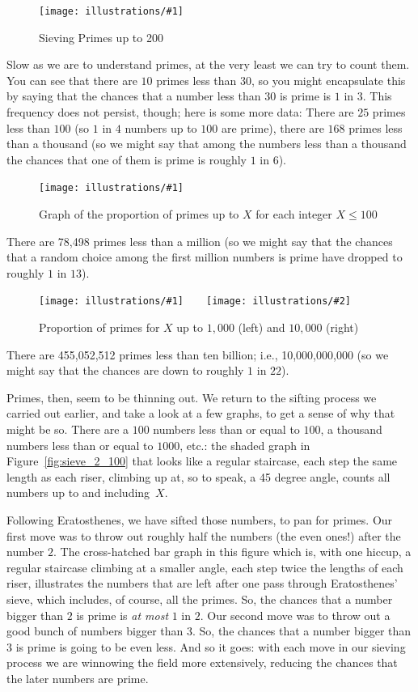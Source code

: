 \documentclass[openany]{book}
\newcommand{\ill}[3]{%
   \begin{figure}[H]%
   \vspace{-2ex}
   \centering%
   \texttt{[image: illustrations/\#1]}%
   \caption{#3}%
   \vspace{-2ex}
    \end{figure}}
\newcommand{\illtwo}[4]{%
   \begin{figure}[H]\centering%
   \texttt{[image: illustrations/\#1]}$\qquad$\texttt{[image: illustrations/\#2]}%
   \caption{#4}%
    \end{figure}}
\theoremstyle{plain}
\theoremstyle{definition}
\begin{document}
\ill{sieve200}{.8}{Sieving Primes up to 200}

Slow as we are to understand primes, at the very least we can try to
count them. You can see that there are $10$ primes less than $30$, so
you might encapsulate this by saying that the chances that a number
less than $30$ is prime is $1$ in $3$.  This frequency does not
persist, though; here is some more data: There are $25$ primes less
than $100$ (so $1$ in $4$ numbers up to $100$ are prime), there are
$168$ primes less than a thousand (so we might say that among the
numbers less than a thousand the chances that one of them is prime is
roughly $1$ in $6$).

\ill{proportion_primes_100}{1}{Graph of the proportion of primes up to $X$ for each integer $X\leq 100$}

There are 78,498 primes less than a million (so we might say that
the chances that a random choice among the first million numbers is
prime have dropped to roughly $1$ in $13$).

\illtwo{proportion_primes_1000}{proportion_primes_10000}{0.46}{Proportion of primes for $X$ up to $1{,}000$ (left) and $10{,}000$ (right)}

There are 455,052,512 primes less than ten billion; i.e.,
10,000,000,000 (so we might say that the chances are down to roughly
$1$ in $22$).

Primes, then, seem to be thinning out.  We return to the sifting process
we carried out earlier, and take a look at a few graphs, to get a sense of why
that might be so. There are a $100$ numbers less than or equal to
$100$, a thousand numbers less than or equal to $1000$, etc.: the
shaded graph in Figure~\ref{fig:sieve_2_100} that looks like a regular staircase, each step the
same length as each riser, climbing up at, so to speak, a 45 degree
angle, counts all numbers up to and including~$X$.

Following Eratosthenes, we have sifted those numbers, to pan for
primes. Our first move was to throw out roughly half the numbers (the
even ones!) after the number $2$. The cross-hatched bar graph in this
figure which is, with one hiccup, a regular staircase climbing at a
smaller angle, each step twice the lengths of each riser, illustrates
the numbers that are left after one pass through Eratosthenes' sieve,
which includes, of course, all the primes. So, the chances that a
number bigger than $2$ is prime is {\em at most} $1$ in $2$.  Our
second move was to throw out a good bunch of numbers bigger than $3$.
So, the chances that a number bigger than $3$ is prime is going to be
even less.  And so it goes: with each move in our
sieving process we are winnowing the field more extensively, reducing
the chances that the later numbers are prime.
\end{document}
